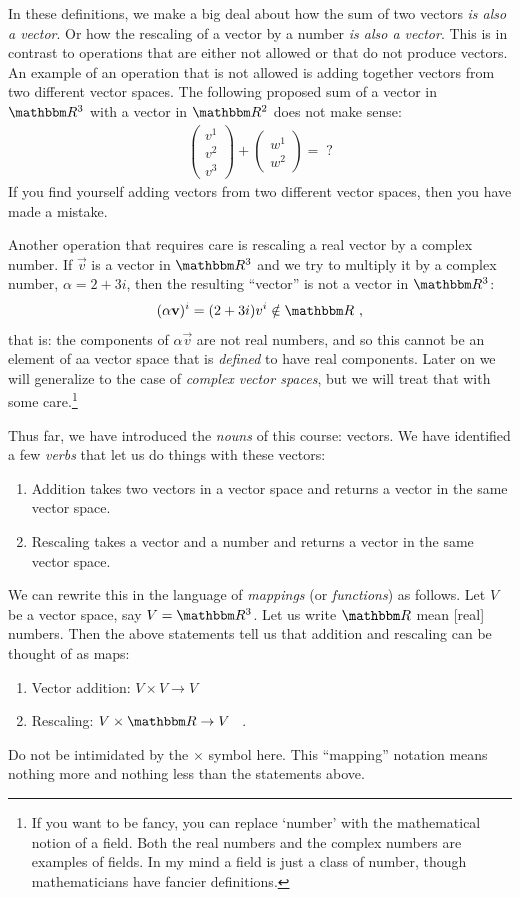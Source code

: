 \documentclass[12pt]{article}
\begin{document}
In these definitions, we make a big deal about how the sum of two vectors \emph{is also a vector}. Or how the rescaling of a vector by a number \emph{is also a vector}. This is in contrast to operations that are either not allowed or that do not produce vectors. An example of an operation that is not allowed is adding together vectors from two different vector spaces. The following proposed sum of a vector in $\RR ^3$ with  a vector in $\RR ^2$ does not make sense:
\begin{align}
    \begin{pmatrix}
        v^1\\ v^2 \\v^3
    \end{pmatrix}
    +
    \begin{pmatrix}
        w^1\\ w^2 
    \end{pmatrix}
    =
    \; ?
\end{align}
If you find yourself adding vectors from two different vector spaces, then you have made a mistake.

Another operation that requires care is rescaling a real vector by a complex number. If $\vec{v}$ is a vector in $\RR ^3$ and we try to multiply it by a complex number, $\alpha = 2+3i$, then the resulting ``vector'' is not a vector in $\RR ^3$:
\begin{align}
    (\alpha\vec{v})^i = (2+3i)v^i \notin \RR  \ ,
\end{align}
that is: the components of $\alpha\vec{v}$ are not real numbers, and so this cannot be an element of aa vector space that is \emph{defined} to have real components. Later on we will generalize to the case of \emph{complex vector spaces}, but we will treat that with some care.\footnote{If you want to be fancy, you can replace `number' with the mathematical notion of a field. Both the real numbers and the complex numbers are examples of fields. In my mind a field is just a class of number, though mathematicians have fancier definitions.}

Thus far, we have introduced the \emph{nouns} of this course: vectors. We have identified a few \emph{verbs} that let us do things with these vectors:
\begin{enumerate}
    \item Addition takes two vectors in a vector space and returns a vector in the same vector space. 
    \item Rescaling takes a vector and a number and returns a vector in the same vector space.
\end{enumerate}
We can rewrite this in the language of \emph{mappings} (or \emph{functions}) as follows. Let $V$ be a vector space, say $V=\RR ^3$. Let us write $\RR $ mean [real] numbers. Then the above statements tell us that addition and rescaling can be thought of as maps:
\begin{enumerate}
    \item Vector addition: $V\times V \to V$
    \item Rescaling: $V\times \RR  \to V$ \ .
\end{enumerate}
Do not be intimidated by the $\times$ symbol here. This ``mapping'' notation means nothing more and nothing less than the statements above.
\end{document}
